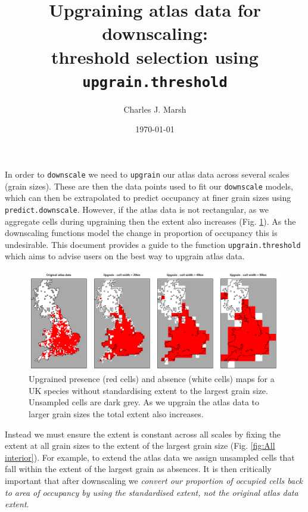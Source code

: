 \documentclass{article}[12pt, a4paper]
\begin{document}


\title{Upgraining atlas data for downscaling: \\ threshold selection using \texttt{upgrain.threshold}}
\author{Charles J. Marsh}
\date{\today}
\maketitle

In order to \texttt{downscale} we need to \texttt{upgrain} our atlas data across several scales (grain sizes). These are then the data points used to fit our \texttt{downscale} models, which can then be extrapolated to predict occupancy at finer grain sizes using \texttt{predict.downscale}. However, if the atlas data is not rectangular, as we aggregate cells during upgraining then the extent also increases (Fig. \ref{fig:Original upgrain}). As the downscaling functions model the change in proportion of occupancy this is undesirable. This document provides a guide to the function \texttt{upgrain.threshold} which aims to advise users on the best way to upgrain atlas data.

\begin{figure}[bth]
\centering
\includegraphics[width=\linewidth]{Original_upgrain.png}
\caption{Upgrained presence (red cells) and absence (white cells) maps for a UK species without standardising extent to the largest grain size. Unsampled cells are dark grey. As we upgrain the atlas data to larger grain sizes the total extent also increases.}
\label{fig:Original upgrain}
\end{figure}

Instead we must ensure the extent is constant across all scales by fixing the extent at all grain sizes to the extent of the largest grain size (Fig. \ref{fig:All interior}). For example, to extend the atlas data we assign unsampled cells that fall within the extent of the largest grain as absences. It is then critically important that after downscaling we \textit{convert our proportion of occupied cells back to area of occupancy by using the standardised extent, not the original atlas data extent}.
\end{document}
